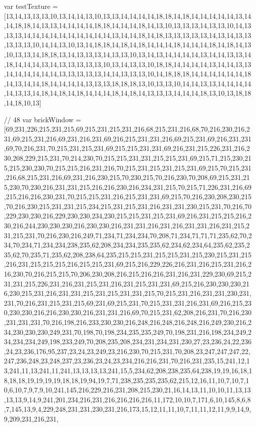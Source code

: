 var testTexture = [13,14,13,13,13,10,13,14,14,13,10,13,13,14,14,14,14,18,18,14,18,14,14,14,14,14,13,14,14,18,18,14,13,13,14,14,14,14,18,18,14,14,14,18,14,13,10,13,13,13,14,13,13,10,14,13,13,13,14,14,14,14,14,14,14,14,14,14,13,14,14,18,14,18,13,13,13,13,13,14,13,14,13,13,13,13,13,10,14,14,13,10,13,14,18,18,14,18,14,18,14,14,14,18,14,14,14,18,14,18,14,13,10,13,13,14,18,18,13,14,13,13,13,14,13,13,10,13,14,13,14,14,14,14,13,14,14,13,13,14,18,14,14,14,13,14,13,13,13,13,13,10,13,14,13,13,10,18,18,14,14,14,14,13,14,14,13,13,14,14,14,14,14,14,13,13,13,13,13,14,14,13,13,13,10,14,18,18,18,14,14,14,14,14,14,18,14,13,14,14,18,14,14,14,14,13,13,13,18,18,18,13,10,13,13,10,14,14,13,13,14,14,14,14,14,13,13,14,18,14,18,14,18,14,14,14,18,14,18,14,13,13,13,14,14,14,18,13,10,13,18,18,14,18,10,13]

// 48
var brickWindow = [69,231,226,215,231,215,69,215,231,215,231,216,68,215,231,216,68,70,216,230,216,231,69,215,231,216,69,231,216,231,69,216,215,231,231,216,69,215,231,69,216,231,231,69,70,216,231,70,215,231,215,231,69,215,215,231,231,69,216,231,215,226,231,216,230,208,229,215,231,70,214,230,70,215,215,231,231,215,215,231,69,215,71,215,230,215,215,230,230,70,215,215,216,231,216,70,215,231,215,231,215,231,69,215,70,215,231,216,68,215,231,216,69,231,216,230,215,70,230,215,70,216,230,70,208,69,215,231,215,230,70,230,216,231,231,215,216,216,230,216,234,231,215,70,215,71,226,231,216,69,215,216,216,230,231,70,215,215,231,216,215,231,231,69,215,70,216,230,208,230,215,70,216,230,215,231,231,215,234,215,231,215,231,216,231,231,230,215,231,70,216,70,229,230,230,216,229,230,230,234,230,215,215,231,215,231,69,216,231,215,215,216,230,216,244,230,230,230,216,230,230,216,231,231,216,231,216,231,231,216,231,215,231,215,231,70,216,230,216,249,71,234,71,234,234,70,208,71,234,71,71,71,235,62,70,234,70,234,71,234,234,238,235,62,208,234,234,235,235,62,234,62,234,64,235,62,235,235,62,70,235,71,235,62,208,238,64,235,215,215,231,215,215,231,215,230,215,231,215,216,231,215,215,215,216,215,215,231,69,215,216,229,226,216,231,216,215,231,216,216,230,70,216,215,215,70,206,230,208,216,215,216,216,231,216,231,229,230,69,215,231,231,215,226,231,216,231,215,231,216,231,215,231,231,69,215,216,230,230,230,216,230,215,231,216,231,231,215,231,215,231,231,215,70,215,231,216,231,231,230,231,231,70,216,231,215,231,215,69,231,69,215,231,70,215,231,231,216,231,69,216,215,230,230,230,216,216,230,230,216,231,231,216,69,70,215,231,62,208,216,231,70,216,230,231,231,231,70,216,198,216,233,230,230,216,248,216,248,216,248,216,249,230,216,234,230,230,230,249,231,70,198,70,198,234,235,235,249,70,198,231,216,198,234,249,234,234,234,249,198,233,249,70,208,235,208,234,231,234,231,230,27,23,236,24,22,236,24,23,236,176,95,237,23,24,23,249,23,216,230,70,215,231,70,208,23,247,247,247,22,247,236,248,23,248,237,23,236,23,24,23,234,216,216,231,70,216,231,235,15,241,12,13,241,11,13,241,11,241,13,13,13,13,241,15,5,234,62,208,238,235,64,238,19,19,16,18,18,18,18,19,19,19,19,18,18,19,94,19,7,71,238,235,235,235,62,215,12,16,11,10,7,10,7,10,6,10,7,9,7,9,10,241,145,216,229,216,231,208,215,230,21,16,14,13,11,10,10,11,13,13,13,13,9,14,9,241,201,234,216,231,216,216,216,216,11,172,10,10,7,171,6,10,145,8,6,8,7,145,13,9,4,229,248,231,231,230,231,216,173,15,12,11,11,10,7,11,11,12,11,9,9,14,9,9,209,231,216,231,